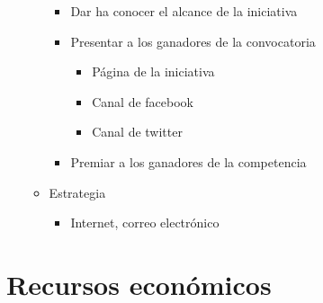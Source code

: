 \documentclass{article}
\begin{document}
\begin{enumerate}
\begin{itemize}
\begin{itemize}
\item Dar ha conocer el alcance de la iniciativa
\item Presentar a los ganadores de la convocatoria
\begin{itemize}
\item Página de la iniciativa 
\item Canal de facebook
\item Canal de twitter
\end{itemize}
\item Premiar a los ganadores de la competencia
\end{itemize}
\item Estrategia
\begin{itemize}
\item Internet, correo electrónico
\end{itemize}
\end{itemize}
\end{enumerate}


\section{Recursos económicos}
\end{document}
